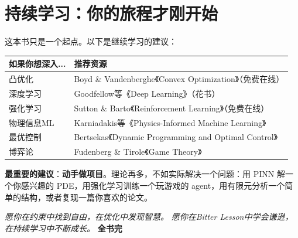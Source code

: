 \section*{持续学习：你的旅程才刚开始}
这本书只是一个起点。以下是继续学习的建议：
\begin{center}
\renewcommand{\arraystretch}{1.4}
\begin{tabularx}{\textwidth}{lX}
\toprule
\textbf{如果你想深入...} & \textbf{推荐资源} \\
\midrule
凸优化 & Boyd \& Vandenberghe《Convex Optimization》（免费在线） \\
深度学习 & Goodfellow等《Deep Learning》（花书） \\
强化学习 & Sutton \& Barto《Reinforcement Learning》（免费在线） \\
物理信息ML & Karniadakis等《Physics-Informed Machine Learning》 \\
最优控制 & Bertsekas《Dynamic Programming and Optimal Control》 \\
博弈论 & Fudenberg \& Tirole《Game Theory》 \\
\bottomrule
\end{tabularx}
\end{center}
\textbf{最重要的建议}：\textbf{动手做项目}。理论再多，不如实际解决一个问题：用 PINN 解一个你感兴趣的 PDE，用强化学习训练一个玩游戏的 agent，用有限元分析一个简单的结构，或者复现一篇你喜欢的论文。
\vspace{0.8cm}
\begin{center}
\Large
\textit{愿你在约束中找到自由，在优化中发现智慧。}
\vspace{0.3cm}
\textit{愿你在Bitter Lesson中学会谦逊，在持续学习中不断成长。}
\vspace{0.5cm}
\normalsize
\textbf{全书完}
\end{center}
